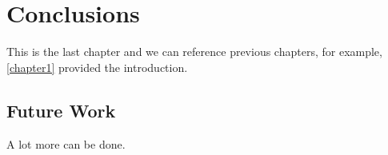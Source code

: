 \chapter{Conclusions} \label{chapter4}

This is the last chapter and we can reference previous chapters, for example,
\autoref{chapter1} provided the introduction.

\section{Future Work} \label{futurework}

A lot more can be done.


